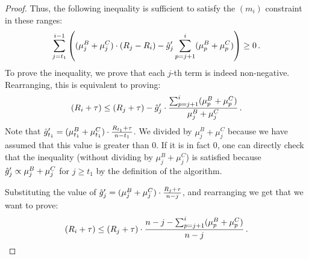 \begin{proof}
    Thus, the following inequality is sufficient to satisfy the $(m_i)$ constraint in these ranges:
    \begin{equation*}
        \sum_{j=t_1}^{i-1} \left((\mu_j^B + \mu_j^C) \cdot (R_j-R_i) - \hat{g}'_j \sum_{p=j+1}^{i} (\mu_p^B+\mu_p^C) \right) \geq 0\,.
    \end{equation*}
    To prove the inequality, we prove that each $j$-th term is indeed non-negative. Rearranging, this is equivalent to proving:
    \begin{equation}\label{eq:mi-phase2-inequality}
        (R_i+\tau) \leq (R_j+\tau) - \hat{g}'_j \cdot \frac{\sum_{p=j+1}^{i} (\mu_p^B + \mu_p^C)}{\mu_j^B+\mu_j^C}\,.
    \end{equation}
    Note that $\hat{g}'_{t_1} = (\mu_{t_1}^B + \mu_{t_1}^C) \cdot \frac{R_{t_1}+\tau}{n-t_1}$.
    We divided by $\mu_j^B + \mu_j^C$ because we have assumed that this value is greater than $0$. If it is in fact $0$, one can directly check that the inequality (without dividing by $\mu_j^B+\mu_j^C$) is satisfied because $\hat{g}'_j \propto \mu_j^B + \mu_j^C$ for $j \geq t_1$ by the definition of the algorithm.

    Substituting the value of $\hat{g}'_j = (\mu_j^B+\mu_j^C)\cdot \frac{R_j+\tau}{n-j}$, and rearranging we get that we want to prove:
    \begin{equation*}
        (R_i+\tau) \leq (R_j+\tau) \cdot \frac{n-j - \sum_{p=j+1}^{i} (\mu_p^B+\mu_p^C)}{n-j}\,.
    \end{equation*}


\end{proof}

